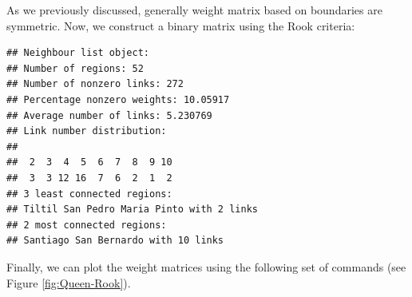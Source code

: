 As we previously discussed, generally weight matrix based on boundaries are symmetric. Now, we construct a binary matrix using the Rook criteria:

\begin{knitrout}
\color{fgcolor}\begin{kframe}
\begin{alltt}
 \hlkwb{<-} \hlstd{(} \hlstd{),}  \hlopt{$}  \hlstd{=}  \hlstd{)}
\end{alltt}
\begin{verbatim}
## Neighbour list object:
## Number of regions: 52 
## Number of nonzero links: 272 
## Percentage nonzero weights: 10.05917 
## Average number of links: 5.230769 
## Link number distribution:
## 
##  2  3  4  5  6  7  8  9 10 
##  3  3 12 16  7  6  2  1  2 
## 3 least connected regions:
## Tiltil San Pedro Maria Pinto with 2 links
## 2 most connected regions:
## Santiago San Bernardo with 10 links
\end{verbatim}
\end{kframe}
\end{knitrout}

Finally, we can plot the weight matrices using the following set of commands (see Figure \ref{fig:Queen-Rook}). 

\begin{knitrout}
\color{fgcolor}\begin{kframe}
\begin{alltt}
\hlstd{(}  \hlstd{=} \hlstd{)}
 \hlkwb{<-} \hlstd{(}\hlstd{(}
  \hlstd{=}  \hlstd{,}  \hlstd{=} \hlstd{)}
  \hlstd{=}  \hlstd{,}  \hlstd{=} \hlstd{)}
\end{alltt}
\end{kframe}
\end{knitrout}


